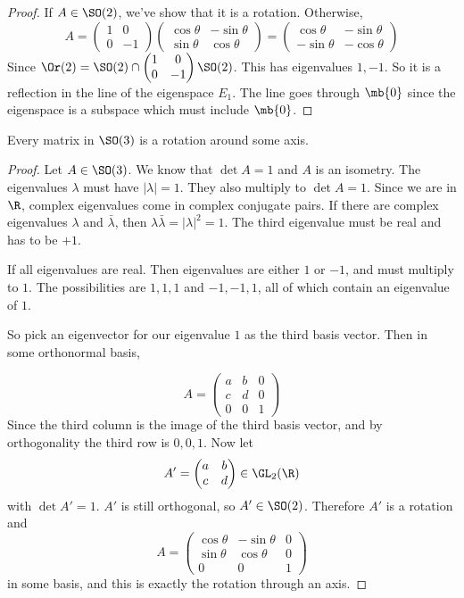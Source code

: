 \documentclass[a4pape]{article}
\begin{document}
\begin{proof}
  If $A\in \SO(2)$, we've show that it is a rotation. Otherwise,
  \[
  A = 
  \begin{pmatrix}
    1 & 0\\
    0 & -1
  \end{pmatrix}
  \begin{pmatrix}
    \cos\theta & -\sin\theta\\
    \sin\theta & \cos\theta
  \end{pmatrix} = 
  \begin{pmatrix}
    \cos\theta & -\sin\theta \\
    -\sin\theta & -\cos\theta
  \end{pmatrix}
  \]
  Since $\Or(2) = \SO(2)\cap 
\begin{pmatrix}
  1&0\\0&-1
\end{pmatrix}\SO(2)$. This has eigenvalues $1, -1$. So it is a reflection in the line of the eigenspace $E_1$. The line goes through $\mb{0}$ since the eigenspace is a subspace which must include $\mb{0}$.
\end{proof}

\begin{lemma}
  Every matrix in $\SO(3)$ is a rotation around some axis. 
\end{lemma}

\begin{proof}
  Let $A\in \SO(3)$. We know that $\det A = 1$ and $A$ is an isometry. The eigenvalues $\lambda$ must have $|\lambda| = 1$. They also multiply to $\det A = 1$. Since we are in $\R$, complex eigenvalues come in complex conjugate pairs. If there are complex eigenvalues $\lambda$ and $\bar\lambda$, then $\lambda\bar\lambda = |\lambda|^2 = 1$. The third eigenvalue must be real and has to be $+1$.

If all eigenvalues are real. Then eigenvalues are either $1$ or $-1$, and must multiply to $1$. The possibilities are $1, 1, 1$ and $-1, -1, 1$, all of which contain an eigenvalue of $1$.

So pick an eigenvector for our eigenvalue $1$ as the third basis vector. Then in some orthonormal basis,

\[
A = \begin{pmatrix}
  a & b & 0\\
  c & d & 0\\
  0 & 0 & 1
\end{pmatrix}
\]
Since the third column is the image of the third basis vector, and by orthogonality the third row is $0, 0, 1$. Now let
\[A' = \begin{pmatrix}
  a & b\\
  c & d
\end{pmatrix} \in \GL_2(\R)
\]
with $\det A' = 1$. $A'$ is still orthogonal, so $A'\in \SO(2)$. Therefore $A'$ is a rotation and
\[
A = 
\begin{pmatrix}
  \cos\theta & -\sin\theta & 0\\
  \sin\theta & \cos\theta & 0\\
  0 & 0 & 1
\end{pmatrix}
\]
in some basis, and this is exactly the rotation through an axis.
\end{proof}
\end{document}
